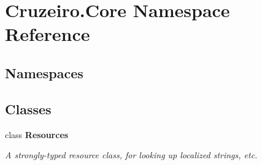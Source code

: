 \hypertarget{namespace_cruzeiro_1_1_core}{}\section{Cruzeiro.\+Core Namespace Reference}
\label{namespace_cruzeiro_1_1_core}
\subsection*{Namespaces}
\begin{DoxyCompactItemize}
\end{DoxyCompactItemize}
\subsection*{Classes}
\begin{DoxyCompactItemize}
\item 
class {\bfseries Resources}
\begin{DoxyCompactList}\small\item\em A strongly-\/typed resource class, for looking up localized strings, etc. \end{DoxyCompactList}\end{DoxyCompactItemize}
